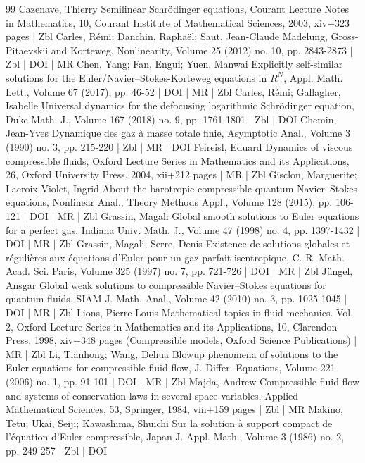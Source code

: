 \begin{thebibliography}{99}
Cazenave, Thierry Semilinear Schrödinger equations, Courant Lecture Notes in Mathematics, 10, Courant Institute of Mathematical Sciences, 2003, xiv+323 pages | Zbl
Carles, Rémi; Danchin, Raphaël; Saut, Jean-Claude Madelung, Gross-Pitaevskii and Korteweg, Nonlinearity, Volume 25 (2012) no. 10, pp. 2843-2873 | Zbl | DOI | MR
Chen, Yang; Fan, Engui; Yuen, Manwai Explicitly self-similar solutions for the Euler/Navier–Stokes-Korteweg equations in ${R}^{N}$, Appl. Math. Lett., Volume 67 (2017), pp. 46-52 | DOI | MR | Zbl
Carles, Rémi; Gallagher, Isabelle Universal dynamics for the defocusing logarithmic Schrödinger equation, Duke Math. J., Volume 167 (2018) no. 9, pp. 1761-1801 | Zbl | DOI
Chemin, Jean-Yves Dynamique des gaz à masse totale finie, Asymptotic Anal., Volume 3 (1990) no. 3, pp. 215-220 | Zbl | MR | DOI
Feireisl, Eduard Dynamics of viscous compressible fluids, Oxford Lecture Series in Mathematics and its Applications, 26, Oxford University Press, 2004, xii+212 pages | MR | Zbl
Gisclon, Marguerite; Lacroix-Violet, Ingrid About the barotropic compressible quantum Navier–Stokes equations, Nonlinear Anal., Theory Methods Appl., Volume 128 (2015), pp. 106-121 | DOI | MR | Zbl
Grassin, Magali Global smooth solutions to Euler equations for a perfect gas, Indiana Univ. Math. J., Volume 47 (1998) no. 4, pp. 1397-1432 | DOI | MR | Zbl
Grassin, Magali; Serre, Denis Existence de solutions globales et régulières aux équations d’Euler pour un gaz parfait isentropique, C. R. Math. Acad. Sci. Paris, Volume 325 (1997) no. 7, pp. 721-726 | DOI | MR | Zbl
Jüngel, Ansgar Global weak solutions to compressible Navier–Stokes equations for quantum fluids, SIAM J. Math. Anal., Volume 42 (2010) no. 3, pp. 1025-1045 | DOI | MR | Zbl
Lions, Pierre-Louis Mathematical topics in fluid mechanics. Vol. 2, Oxford Lecture Series in Mathematics and its Applications, 10, Clarendon Press, 1998, xiv+348 pages (Compressible models, Oxford Science Publications) | MR | Zbl
Li, Tianhong; Wang, Dehua Blowup phenomena of solutions to the Euler equations for compressible fluid flow, J. Differ. Equations, Volume 221 (2006) no. 1, pp. 91-101 | DOI | MR | Zbl
Majda, Andrew Compressible fluid flow and systems of conservation laws in several space variables, Applied Mathematical Sciences, 53, Springer, 1984, viii+159 pages | Zbl | MR
Makino, Tetu; Ukai, Seiji; Kawashima, Shuichi Sur la solution à support compact de l’équation d’Euler compressible, Japan J. Appl. Math., Volume 3 (1986) no. 2, pp. 249-257 | Zbl | DOI

\end{thebibliography}
